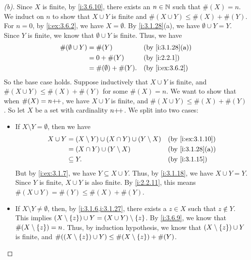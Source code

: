 \begin{proof}[(b)]
  Since \(X\) is finite, by \cref{i:3.6.10}, there exists an \(n \in \mathbb{N}\) such that \(\#(X) = n\).
  We induct on \(n\) to show that \(X \cup Y\) is finite and \(\#(X \cup Y) \leq \#(X) + \#(Y)\).
  For \(n = 0\), by \cref{i:ex:3.6.2}, we have \(X = \emptyset\).
  By \cref{i:3.1.28}(a), we have \(\emptyset \cup Y = Y\).
  Since \(Y\) is finite, we know that \(\emptyset \cup Y\) is finite.
  Thus, we have
  \begin{align*}
    \#(\emptyset \cup Y) & = \#(Y)                  &  & \by{i:3.1.28}[a] \\
                         & = 0 + \#(Y)              &  & \by{i:2.2.1}     \\
                         & = \#(\emptyset) + \#(Y). &  & \by{i:ex:3.6.2}
  \end{align*}
  So the base case holds.
  Suppose inductively that \(X \cup Y\) is finite, and \(\#(X \cup Y) \leq \#(X) + \#(Y)\) for some \(\#(X) = n\).
  We want to show that when \(\#(X) = n{+}\!{+}\), we have \(X \cup Y\) is finite, and \(\#(X \cup Y) \leq \#(X) + \#(Y)\).
  So let \(X\) be a set with cardinality \(n{+}\!{+}\).
  We split into two cases:
  \begin{itemize}
    \item If \(X \setminus Y = \emptyset\), then we have
          \begin{align*}
            X \cup Y & = (X \setminus Y) \cup (X \cap Y) \cup (Y \setminus X) &  & \by{i:ex:3.1.10} \\
                     & = (X \cap Y) \cup (Y \setminus X)                      &  & \by{i:3.1.28}[a] \\
                     & \subseteq Y.                                           &  & \by{i:3.1.15}
          \end{align*}
          But by \cref{i:ex:3.1.7}, we have \(Y \subseteq X \cup Y\).
          Thus, by \cref{i:3.1.18}, we have \(X \cup Y = Y\).
          Since \(Y\) is finite, \(X \cup Y\) is also finite.
          By \cref{i:2.2.11}, this means \(\#(X \cup Y) = \#(Y) \leq \#(X) + \#(Y)\).
    \item If \(X \setminus Y \neq \emptyset\), then, by \cref{i:3.1.6,i:3.1.27}, there exists a \(z \in X\) such that \(z \notin Y\).
          This implies \((X \setminus \left\lbrace z\right\rbrace) \cup Y = (X \cup Y) \setminus \left\lbrace z\right\rbrace\).
          By \cref{i:3.6.9}, we know that \(\#(X \setminus \left\lbrace z\right\rbrace) = n\).
          Thus, by induction hypothesis, we know that \((X \setminus \left\lbrace z\right\rbrace) \cup Y\) is finite, and \(\#((X \setminus \left\lbrace z\right\rbrace) \cup Y) \leq \#(X \setminus \left\lbrace z\right\rbrace) + \#(Y)\).

\end{itemize}
\end{proof}
